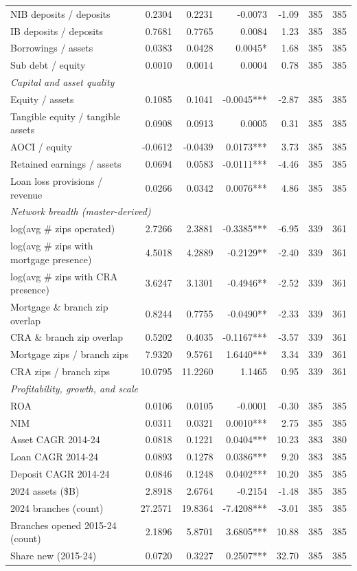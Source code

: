 \begin{tabular}{lrrrrrr}
NIB deposits / deposits & 0.2304 & 0.2231 & -0.0073 & -1.09 & 385 & 385 \\
IB deposits / deposits & 0.7681 & 0.7765 & 0.0084 & 1.23 & 385 & 385 \\
Borrowings / assets & 0.0383 & 0.0428 & 0.0045* & 1.68 & 385 & 385 \\
Sub debt / equity & 0.0010 & 0.0014 & 0.0004 & 0.78 & 385 & 385 \\
\midrule
\multicolumn{7}{l}{\emph{Capital and asset quality}} \\
\midrule
Equity / assets & 0.1085 & 0.1041 & -0.0045*** & -2.87 & 385 & 385 \\
Tangible equity / tangible assets & 0.0908 & 0.0913 & 0.0005 & 0.31 & 385 & 385 \\
AOCI / equity & -0.0612 & -0.0439 & 0.0173*** & 3.73 & 385 & 385 \\
Retained earnings / assets & 0.0694 & 0.0583 & -0.0111*** & -4.46 & 385 & 385 \\
Loan loss provisions / revenue & 0.0266 & 0.0342 & 0.0076*** & 4.86 & 385 & 385 \\
\midrule
\multicolumn{7}{l}{\emph{Network breadth (master-derived)}} \\
\midrule
log(avg \# zips operated) & 2.7266 & 2.3881 & -0.3385*** & -6.95 & 339 & 361 \\
log(avg \# zips with mortgage presence) & 4.5018 & 4.2889 & -0.2129** & -2.40 & 339 & 361 \\
log(avg \# zips with CRA presence) & 3.6247 & 3.1301 & -0.4946** & -2.52 & 339 & 361 \\
Mortgage \& branch zip overlap & 0.8244 & 0.7755 & -0.0490** & -2.33 & 339 & 361 \\
CRA \& branch zip overlap & 0.5202 & 0.4035 & -0.1167*** & -3.57 & 339 & 361 \\
Mortgage zips / branch zips & 7.9320 & 9.5761 & 1.6440*** & 3.34 & 339 & 361 \\
CRA zips / branch zips & 10.0795 & 11.2260 & 1.1465 & 0.95 & 339 & 361 \\
\midrule
\multicolumn{7}{l}{\emph{Profitability, growth, and scale}} \\
\midrule
ROA & 0.0106 & 0.0105 & -0.0001 & -0.30 & 385 & 385 \\
NIM & 0.0311 & 0.0321 & 0.0010*** & 2.75 & 385 & 385 \\
Asset CAGR 2014-24 & 0.0818 & 0.1221 & 0.0404*** & 10.23 & 383 & 380 \\
Loan CAGR 2014-24 & 0.0893 & 0.1278 & 0.0386*** & 9.20 & 383 & 385 \\
Deposit CAGR 2014-24 & 0.0846 & 0.1248 & 0.0402*** & 10.20 & 385 & 385 \\
2024 assets (\$B) & 2.8918 & 2.6764 & -0.2154 & -1.48 & 385 & 385 \\
2024 branches (count) & 27.2571 & 19.8364 & -7.4208*** & -3.01 & 385 & 385 \\
Branches opened 2015-24 (count) & 2.1896 & 5.8701 & 3.6805*** & 10.88 & 385 & 385 \\
Share new (2015-24) & 0.0720 & 0.3227 & 0.2507*** & 32.70 & 385 & 385 \\
\bottomrule
\end{tabular}

